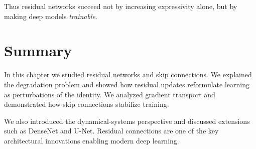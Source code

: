 Thus residual networks succeed not by increasing expressivity alone, but by making deep models \emph{trainable}.

\section{Summary}

In this chapter we studied residual networks and skip connections. We explained the degradation problem and showed how residual updates reformulate learning as perturbations of the identity. We analyzed gradient transport and demonstrated how skip connections stabilize training.

We also introduced the dynamical-systems perspective and discussed extensions such as DenseNet and U-Net. Residual connections are one of the key architectural innovations enabling modern deep learning.
